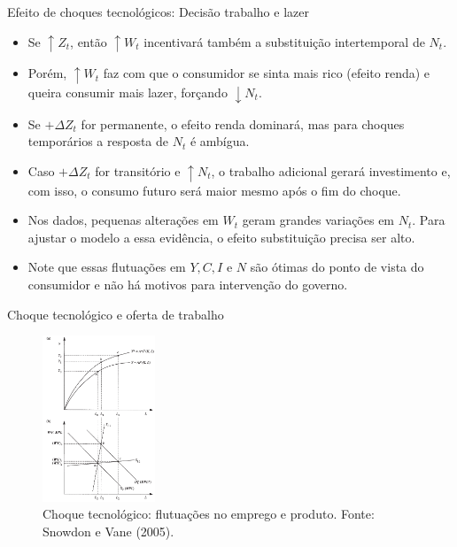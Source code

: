 \documentclass[10pt]{beamer}
\begin{document}
\begin{frame}{Efeito de choques tecnológicos: Decisão trabalho e lazer}
    \begin{itemize}
        \item Se $\uparrow Z_t$, então $\uparrow W_t$ incentivará também a substituição intertemporal de $N_t$.
        \bigskip
        \item Porém, $\uparrow W_t$ faz com que o consumidor se sinta mais rico (efeito renda) e queira consumir mais lazer, forçando $\downarrow N_t$.
        \bigskip
        \item Se $+\Delta Z_t$ for permanente, o efeito renda dominará, mas para choques temporários a resposta de $N_t$ é ambígua.
        \bigskip
        \item Caso $+\Delta Z_t$ for transitório e $\uparrow N_t$, o trabalho adicional gerará investimento e, com isso, o consumo futuro será maior mesmo após o fim do choque.
        \bigskip
        \item Nos dados, pequenas alterações em $W_t$ geram grandes variações em $N_t$. Para ajustar o modelo a essa evidência, o efeito substituição precisa ser alto.
        \bigskip
        \item Note que essas flutuações em $Y, C, I$ e $N$ são ótimas do ponto de vista do consumidor e não há motivos para intervenção do governo.
    \end{itemize}
\end{frame}

\begin{frame}{Choque tecnológico e oferta de trabalho}
    \begin{figure}
        \centering
        \includegraphics[width=0.3\textwidth]{./figures/aula14_fig7.PNG}
        \caption{Choque tecnológico: flutuações no emprego e produto. Fonte: Snowdon e Vane (2005).}
        \label{fig7}
    \end{figure}
\end{frame}
\end{document}
